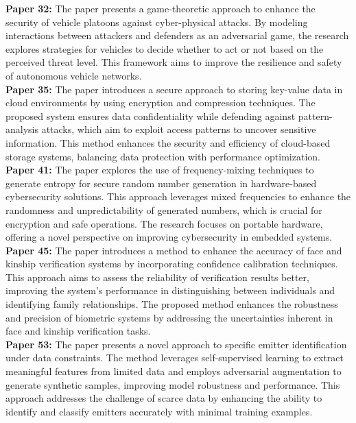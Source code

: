 \documentclass[10pt]{article}
\begin{document}
\noindent\textbf{Paper 32:} The paper  presents a game-theoretic approach to enhance the security of vehicle platoons against cyber-physical attacks. By modeling interactions between attackers and defenders as an adversarial game, the research explores strategies for vehicles to decide whether to act or not based on the perceived threat level. This framework aims to improve the resilience and safety of autonomous vehicle networks.\\

\noindent\textbf{Paper 35:} The paper introduces a secure approach to storing key-value data in cloud environments by using encryption and compression techniques. The proposed system ensures data confidentiality while defending against pattern-analysis attacks, which aim to exploit access patterns to uncover sensitive information. This method enhances the security and efficiency of cloud-based storage systems, balancing data protection with performance optimization.\\

\noindent\textbf{Paper 41:} The paper explores the use of frequency-mixing techniques to generate entropy for secure random number generation in hardware-based cybersecurity solutions. This approach leverages mixed frequencies to enhance the randomness and unpredictability of generated numbers, which is crucial for encryption and safe operations. The research focuses on portable hardware, offering a novel perspective on improving cybersecurity in embedded systems.\\

\noindent\textbf{Paper 45:} The paper introduces a method to enhance the accuracy of face and kinship verification systems by incorporating confidence calibration techniques. This approach aims to assess the reliability of verification results better, improving the system's performance in distinguishing between individuals and identifying family relationships. The proposed method enhances the robustness and precision of biometric systems by addressing the uncertainties inherent in face and kinship verification tasks.\\

\noindent\textbf{Paper 53:} The paper presents a novel approach to specific emitter identification under data constraints. The method leverages self-supervised learning to extract meaningful features from limited data and employs adversarial augmentation to generate synthetic samples, improving model robustness and performance. This approach addresses the challenge of scarce data by enhancing the ability to identify and classify emitters accurately with minimal training examples.\\
\end{document}
